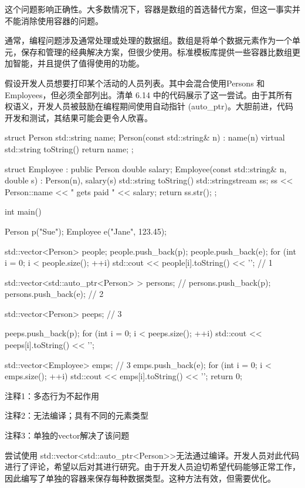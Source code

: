 这个问题影响正确性。大多数情况下，容器是数组的首选替代方案，但这一事实并不能消除使用容器的问题。


通常，编程问题涉及通常处理或处理的数据组。数组是将单个数据元素作为一个单元，保存和管理的经典解决方案，但很少使用。标准模板库提供一些容器比数组更加智能，并且提供了值得使用的功能。

假设开发人员想要打印某个活动的人员列表。其中会混合使用Persons 和 Employees，但必须全部列出。清单 6.14 中的代码展示了这一尝试。由于其所有权语义，开发人员被鼓励在编程期间使用自动指针 (auto\_ptr)。大胆前进，代码开发和测试，其结果可能会更令人欣喜。


\begin{cpp}
struct Person {
  std::string name;
  Person(const std::string& n) : name(n) {}
  virtual std::string toString() { return name; }
};

struct Employee : public Person {
  double salary;
  Employee(const std::string& n, double s) : Person(n), salary(s) {}
  std::string toString() {
    std::stringstream ss;
    ss << Person::name << " gets paid " << salary;
    return ss.str();
  }
};

int main() {
  Person p("Sue");
  Employee e("Jane", 123.45);

  std::vector<Person> people;
  people.push_back(p);
  people.push_back(e);
  for (int i = 0; i < people.size(); ++i)
    std::cout << people[i].toString() << '\n'; // 1

  std::vector<std::auto_ptr<Person> > persons;
  // persons.push_back(p); persons.push_back(e); // 2

  std::vector<Person> peeps; // 3

  peeps.push_back(p);
  for (int i = 0; i < peeps.size(); ++i)
    std::cout << peeps[i].toString() << '\n';

  std::vector<Employee> emps; // 3
  emps.push_back(e);
  for (int i = 0; i < emps.size(); ++i)
    std::cout << emps[i].toString() << '\n';
  return 0;
}
\end{cpp}

{\footnotesize
注释1：多态行为不起作用

注释2：无法编译；具有不同的元素类型

注释3：单独的vector解决了该问题
}


尝试使用 std::vector<std::auto\_ptr<Person>{}>无法通过编译。开发人员对此代码进行了评论，希望以后对其进行研究。由于开发人员迫切希望代码能够正常工作，因此编写了单独的容器来保存每种数据类型。这种方法有效，但需要优化。


